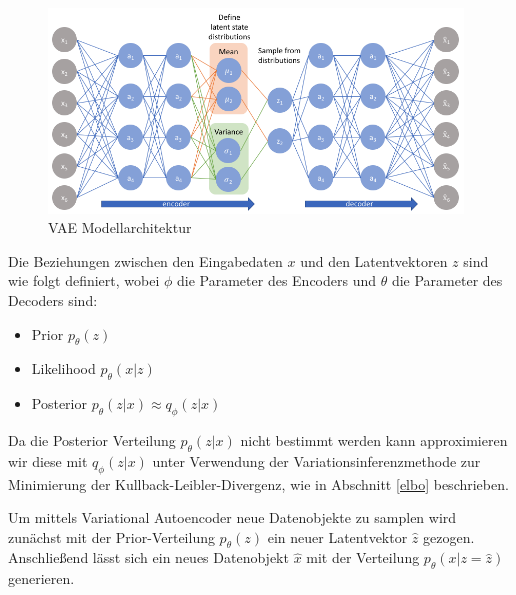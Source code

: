 \begin{figure}[h]
    \centering
    \includegraphics[width=11cm]{bilder/vae}
    \caption{VAE Modellarchitektur}
    \label{vae_model}
\end{figure}
Die Beziehungen zwischen den Eingabedaten $x$ und den Latentvektoren $z$ sind wie folgt definiert, wobei $\phi$ die Parameter des Encoders und $\theta$ die Parameter des Decoders sind:
\begin{itemize}
\item Prior $p_\theta (z)$
\item Likelihood $p_\theta (x|z)$
\item Posterior $p_\theta (z|x)  \approx q_\phi (z|x)$
\end{itemize}

Da die Posterior Verteilung $p_\theta (z|x)$ nicht bestimmt werden kann approximieren wir diese mit $q_\phi (z|x)$ unter Verwendung der Variationsinferenzmethode zur Minimierung der Kullback-Leibler-Divergenz, wie in Abschnitt \ref{elbo} beschrieben.

Um mittels Variational Autoencoder neue Datenobjekte zu samplen wird zunächst mit der Prior-Verteilung $p_\theta (z)$ ein neuer Latentvektor $\hat{z}$ gezogen. Anschließend lässt sich ein neues Datenobjekt $\hat{x}$ mit der Verteilung $p_\theta (x|z=\hat{z})$ generieren.
